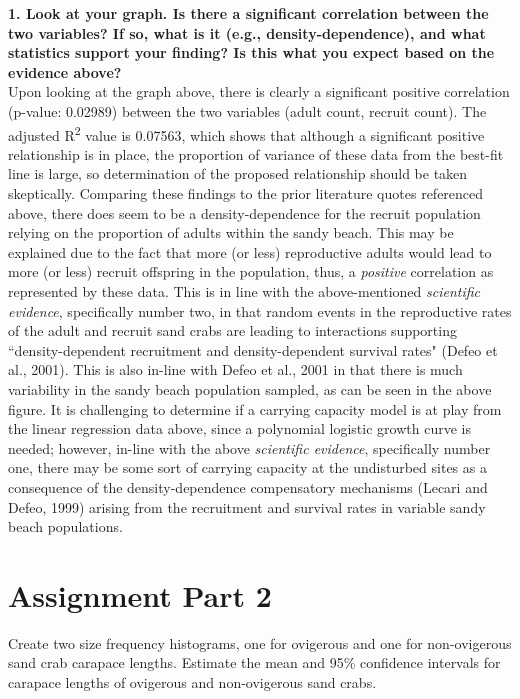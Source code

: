 \documentclass[11pt]{article}
\begin{document}
{\bf 1. Look at your graph. Is there a significant correlation between the two variables? If so, what is it (e.g., density-dependence), and what statistics support your finding? Is this what you expect based on the evidence above?} \\
Upon looking at the graph above, there is clearly a significant positive correlation (p-value: 0.02989) between the two variables (adult count, recruit count). The adjusted R\textsuperscript{2} value is 0.07563, which shows that although a significant positive relationship is in place, the proportion of variance of these data from the best-fit line is large, so determination of the proposed relationship should be taken skeptically. Comparing these findings to the prior literature quotes referenced above, there does seem to be a density-dependence for the recruit population relying on the proportion of adults within the sandy beach. This may be explained due to the fact that more (or less) reproductive adults would lead to more (or less) recruit offspring in the population, thus, a {\it positive} correlation as represented by these data. This is in line with the above-mentioned {\it scientific evidence}, specifically number two, in that random events in the reproductive rates of the adult and recruit sand crabs are leading to interactions supporting ``density-dependent recruitment and density-dependent survival rates" (Defeo et al., 2001). This is also in-line with Defeo et al., 2001 in that there is much variability in the sandy beach population sampled, as can be seen in the above figure. It is challenging to determine if a carrying capacity model is at play from the linear regression data above, since a polynomial logistic growth curve is needed; however, in-line with the above {\it scientific evidence}, specifically number one, there may be some sort of carrying capacity at the undisturbed sites as a consequence of the density-dependence compensatory mechanisms (Lecari and Defeo, 1999) arising from the recruitment and survival rates in variable sandy beach populations. 

\section{Assignment Part 2}
Create two size frequency histograms, one for ovigerous and one for non-ovigerous sand crab carapace lengths. Estimate the mean and 95\% confidence intervals for carapace lengths of ovigerous and non-ovigerous sand crabs.
\end{document}
